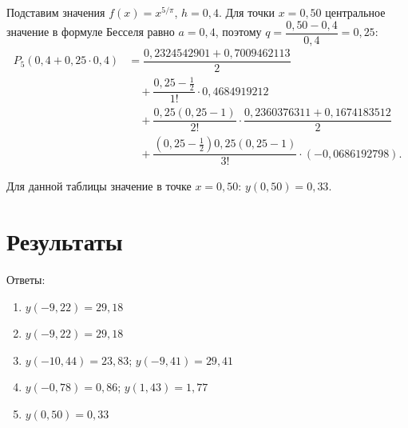 \documentclass[14pt,a4paper]{extarticle}
\begin{document}
	\noindent Подставим значения $f(x)=x^{5/\pi}$, $h=0{,}4$. Для точки $x=0{,}50$ центральное значение в формуле Бесселя равно $a=0{,}4$, поэтому $q=\dfrac{0{,}50-0{,}4}{0{,}4}=0{,}25$:
	\begingroup\small
	\begin{align*}
		P_5(0{,}4+0{,}25\cdot0{,}4)
		&=\dfrac{0{,}2324542901+0{,}7009462113}{2}\\
		&\quad+\dfrac{0{,}25-\frac{1}{2}}{1!}\cdot0{,}4684919212\\
		&\quad+\dfrac{0{,}25(0{,}25-1)}{2!}\cdot
		\dfrac{0{,}2360376311+0{,}1674183512}{2}\\
		&\quad+\dfrac{(0{,}25-\frac{1}{2})0{,}25(0{,}25-1)}{3!}\cdot(-0{,}0686192798).
	\end{align*}
	\endgroup
	
	Для данной таблицы значение в точке $x= 0,50$: $y(0,50) = 0,33$.
	
	\newpage
	
	\section{Результаты}
	Ответы:
	\begin{enumerate}
		\item $y(-9,22) = 29,18$
		\item $y(-9,22) = 29,18$
		\item $y(-10,44) = 23,83$; $y(-9,41) = 29,41$
		\item $y(-0,78) = 0,86$; $y(1,43) = 1,77$
		\item $y(0,50) = 0,33$
	\end{enumerate}
	
	\newpage
	
\end{document}

